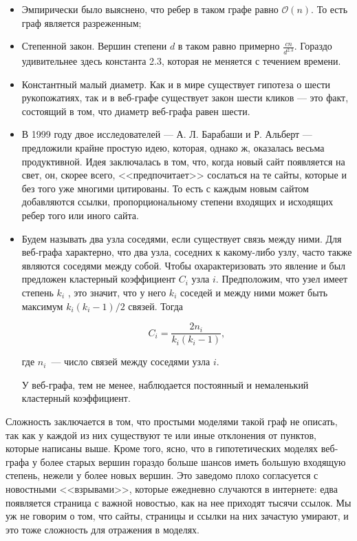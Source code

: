 \begin{itemize}
  \item Эмпирически было выяснено, что ребер в таком графе равно $\mathcal{O}(n)$.
  То есть граф является разреженным;
  \item Степенной закон. Вершин степени $d$ в таком равно примерно $\frac{cn}{d^{2.3}}$.
  Гораздо удивительнее здесь константа 2.3, которая не меняется с течением времени.
  \item Константный малый диаметр. Как и в мире существует гипотеза о шести рукопожатиях,
  так и в веб-графе существует закон шести кликов --- это факт, состоящий в том,
  что диаметр веб-графа равен шести.
  \item В 1999 году двое исследователей --- А. Л. Барабаши и Р. Альберт --- 
  предложили крайне простую идею, которая, однако ж, оказалась весьма продуктивной.
  Идея заключалась в том, что, когда новый сайт появляется на свет, он, скорее 
  всего, <<предпочитает>> сослаться на те сайты, которые и без того уже многими 
  цитированы. То есть с каждым новым сайтом добавляются ссылки, пропорциональному
  степени входящих и исходящих ребер того или иного сайта.
  \item Будем называть два узла соседями, если существует связь между ними. 
  Для веб-графа характерно, что два узла, соседних к какому-либо узлу, 
  часто также являются соседями между собой. Чтобы охарактеризовать это явление 
  и был предложен кластерный коэффициент $C_i$ узла $i$.
  Предположим, что узел имеет степень $k_i$ , это значит, что у него $k_i$ соседей
  и между ними может быть максимум $k_i (k_i - 1)/2$ связей. Тогда

  $$ C_i = \frac{2 n_i}{k_i (k_i - 1)},$$
  
  где $n_i$ --- число связей между соседями узла $i$.

  У веб-графа, тем не менее, наблюдается постоянный и немаленький
  кластерный коэффициент.
\end{itemize}

Сложность заключается в том, что простыми моделями такой граф не описать, так
как у каждой из них существуют те или иные отклонения от пунктов, которые написаны
выше. Кроме того, ясно, что в гипотетических моделях веб-графа
у более старых вершин гораздо больше шансов
иметь большую входящую степень, нежели у более новых вершин. Это заведомо плохо
согласуется с новостными <<взрывами>>, которые ежедневно случаются в интернете: 
едва появляется страница с важной новостью, как на нее приходят тысячи ссылок.
Мы уж не говорим о том, что сайты, страницы и ссылки на них зачастую умирают,
и это тоже сложность для отражения в моделях.

